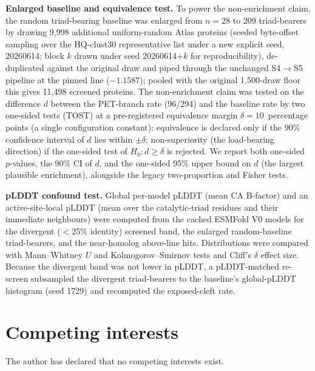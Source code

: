 \textbf{Enlarged baseline and equivalence test.} To power the non-enrichment claim,
the random triad-bearing baseline was enlarged from $n=28$ to 209 triad-bearers
by drawing 9,998 additional uniform-random Atlas proteins (seeded
byte-offset sampling over the HQ-clust30 representative list under a new explicit seed,
20260614; block $k$ drawn under seed 20260614$+k$ for reproducibility),
de-duplicated against the original draw and piped through the unchanged S4$\to$S5
pipeline at the pinned line ($-1.1587$); pooled with the original 1,500-draw floor this
gives 11,498 screened proteins. The non-enrichment claim was tested on the
difference $d$ between the PET-branch rate (96/294) and the baseline rate by two
one-sided tests (TOST) at a pre-registered equivalence margin $\delta=
10$~percentage points (a single configuration constant): equivalence is
declared only if the 90\% confidence interval of $d$ lies within $\pm\delta$;
non-superiority (the load-bearing direction) if the one-sided test of $H_0\!: d \ge
\delta$ is rejected. We report both one-sided $p$-values, the 90\% CI of $d$, and the
one-sided 95\% upper bound on $d$ (the largest plausible enrichment), alongside the
legacy two-proportion and Fisher tests.

\textbf{pLDDT confound test.} Global per-model pLDDT (mean CA B-factor) and an
active-site-local pLDDT (mean over the catalytic-triad residues and their immediate
neighbours) were computed from the cached ESMFold V0 models for the divergent
($<$25\% identity) screened band, the enlarged random-baseline triad-bearers, and the
near-homolog above-line hits. Distributions were compared with Mann--Whitney $U$ and
Kolmogorov--Smirnov tests and Cliff's $\delta$ effect size. Because the divergent band
was not lower in pLDDT, a pLDDT-matched re-screen subsampled the divergent
triad-bearers to the baseline's global-pLDDT histogram (seed 1729) and recomputed the
exposed-cleft rate.


\section*{Competing interests}
The author has declared that no competing interests exist.

